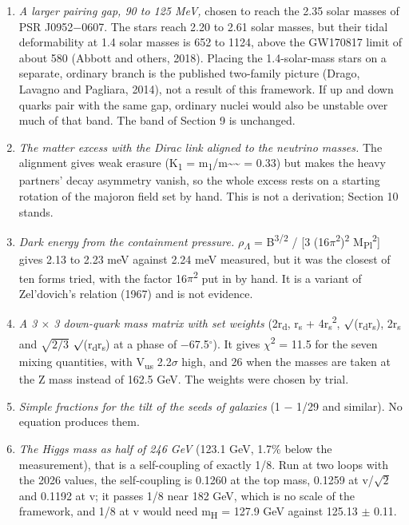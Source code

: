 \documentclass[
  11pt,
]{article}
\begin{document}
\begin{enumerate}
\item
  \emph{A larger pairing gap, 90 to 125 MeV,} chosen to reach the 2.35 solar masses of PSR J0952\ensuremath{-}0607. The stars reach 2.20 to 2.61 solar masses, but their tidal deformability at 1.4 solar masses is 652 to 1124, above the GW170817 limit of about 580 (Abbott and others, 2018). Placing the 1.4-solar-mass stars on a separate, ordinary branch is the published two-family picture (Drago, Lavagno and Pagliara, 2014), not a result of this framework. If up and down quarks pair with the same gap, ordinary nuclei would also be unstable over much of that band. The band of Section 9 is unchanged.
\item
  \emph{The matter excess with the Dirac link aligned to the neutrino masses.} The alignment gives weak erasure (K\textsubscript{1} = m\textsubscript{1}/m\textasciitilde*\textasciitilde{} = 0.33) but makes the heavy partners' decay asymmetry vanish, so the whole excess rests on a starting rotation of the majoron field set by hand. This is not a derivation; Section 10 stands.
\item
  \emph{Dark energy from the containment pressure.} \ensuremath{\rho}\textsubscript{\ensuremath{\Lambda}} = B\textsuperscript{3/2} / {[}3 (16\ensuremath{\pi}\textsuperscript{2})\textsuperscript{2} M\textsubscript{Pl}\textsuperscript{2}{]} gives 2.13 to 2.23 meV against 2.24 meV measured, but it was the closest of ten forms tried, with the factor 16\ensuremath{\pi}\textsuperscript{2} put in by hand. It is a variant of Zel'dovich's relation (1967) and is not evidence.
\item
  \emph{A 3 \ensuremath{\times} 3 down-quark mass matrix with set weights} (2r\textsubscript{d}, r\textsubscript{s} + 4r\textsubscript{s}\textsuperscript{2}, \ensuremath{\surd}(r\textsubscript{d}r\textsubscript{s}), 2r\textsubscript{s} and \ensuremath{\sqrt{2/3}} \ensuremath{\surd}(r\textsubscript{d}r\textsubscript{s}) at a phase of \ensuremath{-}67.5\ensuremath{^\circ}). It gives \ensuremath{\chi}\textsuperscript{2} = 11.5 for the seven mixing quantities, with \textbar V\textsubscript{us}\textbar{} 2.2\ensuremath{\sigma} high, and 26 when the masses are taken at the Z mass instead of 162.5 GeV. The weights were chosen by trial.
\item
  \emph{Simple fractions for the tilt of the seeds of galaxies} (1 \ensuremath{-} 1/29 and similar). No equation produces them.
\item
  \emph{The Higgs mass as half of 246 GeV} (123.1 GeV, 1.7\% below the measurement), that is a self-coupling of exactly 1/8. Run at two loops with the 2026 values, the self-coupling is 0.1260 at the top mass, 0.1259 at v/\ensuremath{\sqrt{2}} and 0.1192 at v; it passes 1/8 near 182 GeV, which is no scale of the framework, and 1/8 at v would need m\textsubscript{H} = 127.9 GeV against 125.13 \ensuremath{\pm} 0.11.

\end{enumerate}
\end{document}
